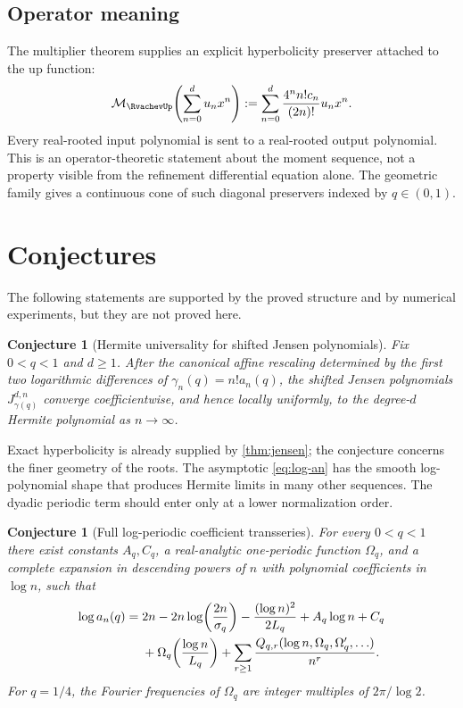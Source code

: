 \documentclass[11pt]{article}
\numberwithin{equation}{section}
\newtheorem{conjecture}[theorem]{Conjecture}
\theoremstyle{definition}
\theoremstyle{remark}
\begin{document}
\subsection{Operator meaning}

The multiplier theorem supplies an explicit hyperbolicity preserver attached to the up function:
\begin{equation}\label{eq:operator}
 \mathcal M_{\RvachevUp}\!\left(\sum_{n=0}^{d}u_nx^n\right)
 :=\sum_{n=0}^{d}\frac{4^nn!c_n}{(2n)!}u_nx^n.
\end{equation}
Every real-rooted input polynomial is sent to a real-rooted output polynomial.  This is an operator-theoretic statement about the moment sequence, not a property visible from the refinement differential equation alone.  The geometric family gives a continuous cone of such diagonal preservers indexed by $q\in(0,1)$.

\section{Conjectures}\label{sec:conjectures}

The following statements are supported by the proved structure and by numerical experiments, but they are not proved here.

\begin{conjecture}[Hermite universality for shifted Jensen polynomials]\label{conj:hermite}
Fix $0<q<1$ and $d\ge1$.  After the canonical affine rescaling determined by the first two logarithmic differences of
$\gamma_n(q)=n!a_n(q)$, the shifted Jensen polynomials
$J_{\gamma(q)}^{d,n}$ converge coefficientwise, and hence locally uniformly, to the degree-$d$ Hermite polynomial as $n\to\infty$.
\end{conjecture}

Exact hyperbolicity is already supplied by \cref{thm:jensen}; the conjecture concerns the finer geometry of the roots.  The asymptotic \eqref{eq:log-an} has the smooth log-polynomial shape that produces Hermite limits in many other sequences.  The dyadic periodic term should enter only at a lower normalization order.

\begin{conjecture}[Full log-periodic coefficient transseries]\label{conj:transseries}
For every $0<q<1$ there exist constants $A_q,C_q$, a real-analytic one-periodic function $\Omega_q$, and a complete expansion in descending powers of $n$ with polynomial coefficients in $\log n$, such that
\begin{align}
 \log a_n(q)
 ={}&2n-2n\log\!\left(\frac{2n}{\sigma_q}\right)
 -\frac{(\log n)^2}{2L_q}+A_q\log n+C_q\notag\\
 &+\Omega_q\!\left(\frac{\log n}{L_q}\right)
 +\sum_{r\ge1}\frac{Q_{q,r}(\log n,
 \Omega_q,\Omega_q',\ldots)}{n^r}.
 \label{eq:transseries-conj}
\end{align}
For $q=1/4$, the Fourier frequencies of $\Omega_q$ are integer multiples of $2\pi/\log2$.
\end{conjecture}
\end{document}
